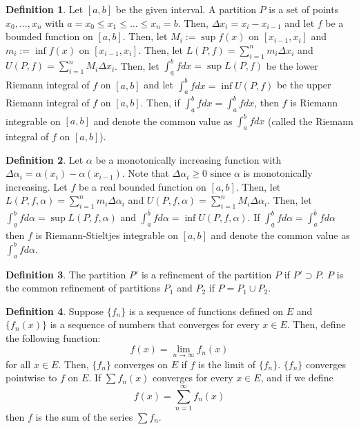 \documentclass[12pt]{article}
\theoremstyle{definition}
\newtheorem{definition}{Definition}
\theoremstyle{named}
\begin{document}
\renewcommand{\thedefinition}{6.1}
\begin{definition}
    Let $[a,b]$ be the given interval. A partition $P$ is a set of points $x_0, \dots, x_n$ with $a=x_0 \leq x_1 \leq \dots \leq x_n = b$. Then, $\Delta x_i = x_i - x_{i-1}$ and let $f$ be a bounded function on $[a,b]$. Then, let $M_i := \sup f(x)$ on $[x_{i-1}, x_i]$ and $m_i := \inf f(x)$ on $[x_{i-1}, x_i]$. Then, let $L(P,f) = \sum_{i=1}^{n} m_i \Delta x_i$ and $U(P,f) = \sum_{i=1}^{n} M_i \Delta x_i$. Then, let $\int_{\underline{a}}^{b} f dx = \sup L(P,f)$ be the lower Riemann integral of $f$ on $[a,b]$ and let $\int_{a}^{\overline{b}} f dx = \inf U(P,f)$ be the upper Riemann integral of $f$ on $[a,b]$. Then, if $\int_{\underline{a}}^{b} f dx = \int_{a}^{\overline{b}} f dx$, then $f$ is Riemann integrable on $[a,b]$ and denote the common value as $\int_{a}^{b} f dx$ (called the Riemann integral of $f$ on $[a,b]$). 
\end{definition}

\renewcommand{\thedefinition}{6.1}
\begin{definition}
    Let $\alpha$ be a monotonically increasing function with $\Delta \alpha_i = \alpha(x_i) - \alpha(x_{i-1})$. Note that $\Delta \alpha_i \geq 0$ since $\alpha$ is monotonically increasing. Let $f$ be a real bounded function on $[a,b]$. Then, let $L(P,f,\alpha) = \sum_{i=1}^{n} m_i \Delta \alpha_i$ and $U(P,f,\alpha) = \sum_{i=1}^{n} M_i \Delta \alpha_i$. Then, let $\int_{\underline{a}}^{b} f d\alpha = \sup L(P,f,\alpha)$ and $\int_{a}^{\overline{b}} f d\alpha = \inf U(P,f,\alpha)$. If $\int_{\underline{a}}^{b} f d\alpha = \int_{a}^{\overline{b}} f d\alpha$ then $f$ is Riemann-Stieltjes integrable on $[a,b]$ and denote the common value as $\int_{a}^{b} f d\alpha$. 
\end{definition}

\renewcommand{\thedefinition}{6.1}
\begin{definition}
    The partition $P'$ is a refinement of the partition $P$ if $P' \supset P$. $P$ is the common refinement of partitions $P_1$ and $P_2$ if $P = P_1 \cup P_2$. 
\end{definition}

\renewcommand{\thedefinition}{6.1}
\begin{definition}
    Suppose $\{f_n\}$ is a sequence of functions defined on $E$ and $\{f_n(x)\}$ is a sequence of numbers that converges for every $x \in E$. Then, define the following function: 
    $$
    f(x) = \lim_{n \to \infty} f_n(x)
    $$ 
    for all $x \in E$. Then, $\{f_n\}$ converges on $E$ if $f$ is the limit of $\{f_n\}$. $\{f_n\}$ converges pointwise to $f$ on $E$. If $\sum f_n(x)$ converges for every $x \in E$, and if we define
    $$
    f(x) = \sum_{n=1}^{\infty} f_n(x)
    $$
    then $f$ is the sum of the series $\sum f_n$. 
\end{definition}
\end{document}
